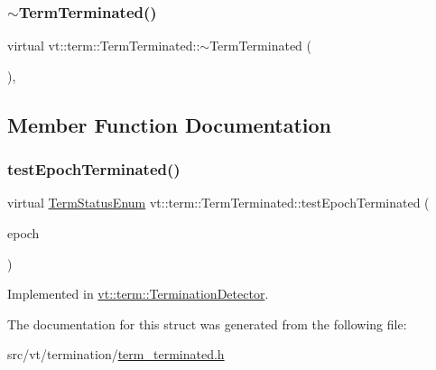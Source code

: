 \subsubsection{\texorpdfstring{$\sim$\+Term\+Terminated()}{~TermTerminated()}}
{\footnotesize\ttfamily virtual vt\+::term\+::\+Term\+Terminated\+::$\sim$\+Term\+Terminated (\begin{DoxyParamCaption}{ }\end{DoxyParamCaption})\hspace{0.3cm}{\ttfamily [virtual]}, {\ttfamily [default]}}



\subsection{Member Function Documentation}
\mbox{\label{structvt_1_1term_1_1_term_terminated_a9d23b646c13a95738f72f7abfc8774c7}} 
\subsubsection{\texorpdfstring{test\+Epoch\+Terminated()}{testEpochTerminated()}}
{\footnotesize\ttfamily virtual \hyperlink{namespacevt_1_1term_ad8ec9b371608fc88e7fdeef219785b27}{Term\+Status\+Enum} vt\+::term\+::\+Term\+Terminated\+::test\+Epoch\+Terminated (\begin{DoxyParamCaption}\item[{\hyperlink{namespacevt_a81d11b28122d43bf9834577e4a06440f}{Epoch\+Type}}]{epoch }\end{DoxyParamCaption})\hspace{0.3cm}{\ttfamily [pure virtual]}}



Implemented in \hyperlink{structvt_1_1term_1_1_termination_detector_a1d3cebd2600b5a3900dd9954de55cf35}{vt\+::term\+::\+Termination\+Detector}.



The documentation for this struct was generated from the following file\+:\begin{DoxyCompactItemize}
\item 
src/vt/termination/\hyperlink{term__terminated_8h}{term\+\_\+terminated.\+h}\end{DoxyCompactItemize}
